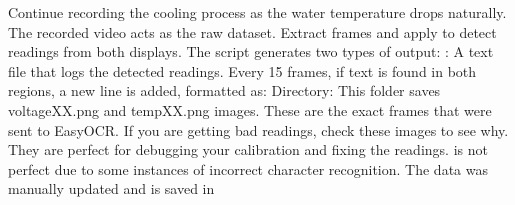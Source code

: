 {}\markdownRendererUlBeginTight
\markdownRendererUlItem Continue recording the cooling process as the water temperature drops naturally.\markdownRendererUlItemEnd 
\markdownRendererUlEndTight \markdownRendererInterblockSeparator
{}\markdownRendererOlBeginTight
{} \markdownRendererOlItemEnd 
\markdownRendererOlEndTight \markdownRendererInterblockSeparator
{}\markdownRendererUlBeginTight
\markdownRendererUlItem The recorded video acts as the raw dataset. \markdownRendererUlItemEnd 
\markdownRendererUlItem Extract frames and apply  to detect readings from both displays. \markdownRendererUlItemEnd 
\markdownRendererUlEndTight \markdownRendererInterblockSeparator
{}
\markdownRendererSectionEnd \markdownRendererSectionBegin
{}\markdownRendererInterblockSeparator
{}The script generates two types of output:\markdownRendererInterblockSeparator
{}\markdownRendererUlBegin
\markdownRendererUlItem {}: A text file that logs the detected readings. Every 15 frames, if text is found in both regions, a new line is added, formatted as: \markdownRendererUlItemEnd 
\markdownRendererUlItem {} Directory: This folder saves voltageXX.png and tempXX.png images. These are the exact frames that were sent to EasyOCR. If you are getting bad readings, check these images to see why. They are perfect for debugging your calibration and fixing the readings.\markdownRendererUlItemEnd 
\markdownRendererUlEnd \markdownRendererInterblockSeparator
{} is not perfect due to some instances of incorrect character recognition. The data was manually updated and is saved in 
\markdownRendererSectionEnd 
\markdownRendererSectionEnd \markdownRendererDocumentEnd